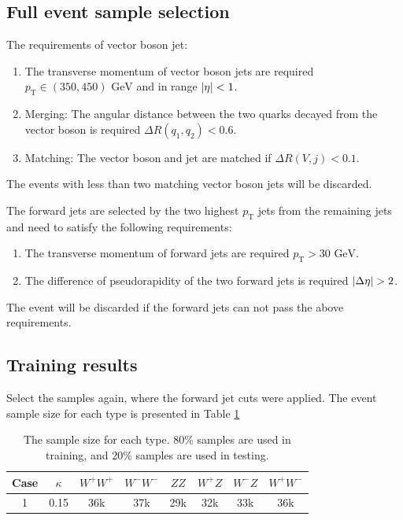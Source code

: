 \documentclass[12pt]{article}
\begin{document}
	\subsection{Full event sample selection}%
	\label{sub:full_event_sample_selection_modified}
		The requirements of vector boson jet:
		\begin{enumerate}
			\item The transverse momentum of vector boson jets are required $p_\text{T} \in (350, 450) \text{ GeV}$ and in range $\abs{\eta}<1$.
			\item Merging: The angular distance between the two quarks decayed from the vector boson is required $\Delta R(q_1,q_2) < 0.6$.
			\item Matching: The vector boson and jet are matched if $\Delta R(V,j) < 0.1$.
		\end{enumerate}
		The events with less than two matching vector boson jets will be discarded.

		The forward jets are selected by the two highest $p_\text{T}$ jets from the remaining jets and need to satisfy the following requirements:
		\begin{enumerate}
			\item The transverse momentum of forward jets are required $p_\text{T} > \text{30 GeV}$.
			\item The difference of pseudorapidity of the two forward jets is required $\abs{\Delta \eta} > 2$.
		\end{enumerate}
		The event will be discarded if the forward jets can not pass the above requirements.
	\subsection{Training results}%
	\label{sub:training_results}
		Select the samples again, where the forward jet cuts were applied. The event sample size for each type is presented in Table \ref{tab:full_event_sample_size_forward_jet_cut}
		\begin{table}[htpb]
			\centering
			\caption{The sample size for each type. 80\% samples are used in training, and 20\% samples are used in testing.}
			\label{tab:full_event_sample_size_forward_jet_cut}
			\begin{tabular}{c|c|c|c|c|c|c|c}
			Case & $\kappa$ & $W^+W^+$ & $W^-W^-$ & $ZZ$ & $W^+Z$ & $W^-Z$ & $W^+W^-$ \\ \hline
			1    & 0.15     & 36k      & 37k      & 29k  & 32k    & 33k    & 36k      
			\end{tabular}
		\end{table}
\end{document}
